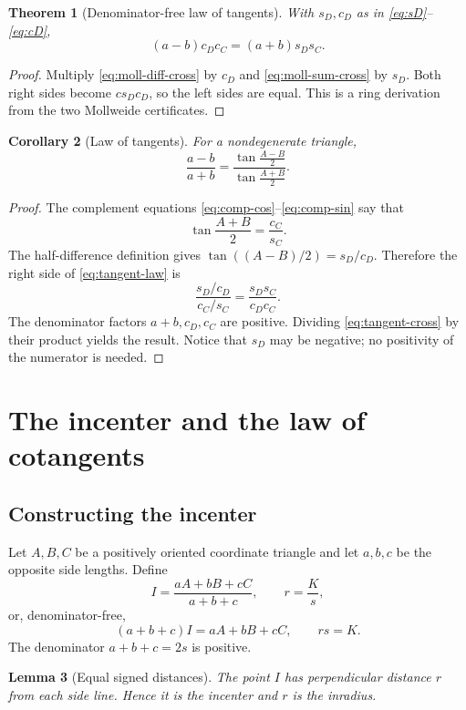 \documentclass[11pt,letterpaper]{article}
\newtheorem{theorem}{Theorem}[section]
\newtheorem{lemma}[theorem]{Lemma}
\newtheorem{corollary}[theorem]{Corollary}
\theoremstyle{definition}
\theoremstyle{remark}
\begin{document}
\begin{theorem}[Denominator-free law of tangents]
\label{thm:tangent-cross}
With \(s_D,c_D\) as in \eqref{eq:sD}--\eqref{eq:cD},
\[
 (a-b)c_Dc_C=(a+b)s_Ds_C.
 \tag{5.1}\label{eq:tangent-cross}
\]
\end{theorem}

\begin{proof}
Multiply \eqref{eq:moll-diff-cross} by \(c_D\) and
\eqref{eq:moll-sum-cross} by \(s_D\).  Both right sides become
\(cs_Dc_D\), so the left sides are equal.  This is a ring derivation from the
two Mollweide certificates.
\end{proof}

\begin{corollary}[Law of tangents]
\label{cor:tangent-law}
For a nondegenerate triangle,
\[
 \frac{a-b}{a+b}
 =\frac{\tan\frac{A-B}{2}}{\tan\frac{A+B}{2}}.
 \tag{5.2}\label{eq:tangent-law}
\]
\end{corollary}

\begin{proof}
The complement equations \eqref{eq:comp-cos}--\eqref{eq:comp-sin} say that
\[
 \tan\frac{A+B}{2}=\frac{c_C}{s_C}.
\]
The half-difference definition gives
\(\tan((A-B)/2)=s_D/c_D\).  Therefore the right side of
\eqref{eq:tangent-law} is
\[
 \frac{s_D/c_D}{c_C/s_C}=\frac{s_Ds_C}{c_Dc_C}.
\]
The denominator factors \(a+b,c_D,c_C\) are positive.  Dividing
\eqref{eq:tangent-cross} by their product yields the result.  Notice that
\(s_D\) may be negative; no positivity of the numerator is needed.
\end{proof}

\section{The incenter and the law of cotangents}
\label{sec:cotangents}

\subsection{Constructing the incenter}

Let \(A,B,C\) be a positively oriented coordinate triangle and let
\(a,b,c\) be the opposite side lengths.  Define
\[
 I=\frac{aA+bB+cC}{a+b+c},
 \qquad
 r=\frac Ks,
 \tag{6.1}\label{eq:incenter}
\]
or, denominator-free,
\[
 (a+b+c)I=aA+bB+cC,
 \qquad rs=K.
 \tag{6.2}\label{eq:incenter-cross}
\]
The denominator \(a+b+c=2s\) is positive.

\begin{lemma}[Equal signed distances]
\label{lem:incenter-distance}
The point \(I\) has perpendicular distance \(r\) from each side line.  Hence it
is the incenter and \(r\) is the inradius.
\end{lemma}
\end{document}
